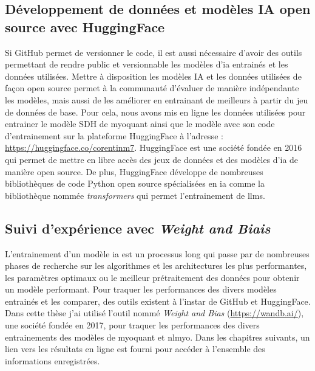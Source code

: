 \subsection{Développement de données et modèles IA open source avec HuggingFace}
Si GitHub permet de versionner le code, il est aussi nécessaire d'avoir des outils permettant de rendre public et versionnable les modèles d'\gls{ia} entrainés et les données utilisées. Mettre à disposition les modèles IA et les données utilisées de façon open source permet à la communauté d'évaluer de manière indépendante les modèles, mais aussi de les améliorer en entrainant de meilleurs à partir du jeu de données de base. Pour cela, nous avons mis en ligne les données utilisées pour entrainer le modèle SDH de \gls{myoquant} ainsi que le modèle avec son code d'entrainement sur la plateforme HuggingFace à l'adresse : \url{https://huggingface.co/corentinm7}. HuggingFace est une société fondée en 2016 qui permet de mettre en libre accès des jeux de données et des modèles d'\gls{ia} de manière open source. De plus, HuggingFace développe de nombreuses bibliothèques de code Python open source spécialisées en \gls{ia} comme la bibliothèque nommée \textit{transformers} qui permet l'entrainement de \gls{llms}.

\subsection{Suivi d'expérience avec \textit{Weight and Biais}}
L'entrainement d'un modèle \gls{ia} est un processus long qui passe par de nombreuses phases de recherche sur les algorithmes et les architectures les plus performantes, les paramètres optimaux ou le meilleur prétraitement des données pour obtenir  un modèle performant. Pour traquer les performances des divers modèles entrainés et les comparer, des outils existent à l'instar de GitHub et HuggingFace. Dans cette thèse j'ai utilisé l'outil nommé \textit{Weight and Bias} (\url{https://wandb.ai/}), une société fondée en 2017, pour traquer les performances des divers entrainements des modèles de \gls{myoquant} et \gls{nlmyo}. Dans les chapitres suivants, un lien vers les résultats en ligne est fourni pour accéder à l'ensemble des informations enregistrées.

